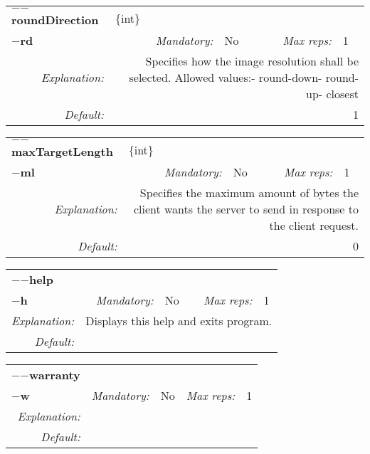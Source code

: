 \begin{center}\begin{tabular}{|rr|rl|rl|}
\hline
\multicolumn{2}{|l|}{\textbf{$-$$-$roundDirection}} & \multicolumn{4}{|l|}{$\{$int$\}$} \\
\cline{3-6}
\multicolumn{2}{|l|}{\textbf{$-$rd}} & \emph{Mandatory:} & No & \emph{Max reps:} & 1 \\
\hline
\emph{Explanation:} & \multicolumn{5}{|p{12cm}|}{Specifies how the image resolution shall be selected. Allowed values:\newline  1- round-down\newline  2- round-up\newline  3- closest} \\
\hline
\emph{Default:} & \multicolumn{5}{|p{12cm}|}{1} \\
\hline
\end{tabular}\end{center}
\begin{center}\begin{tabular}{|rr|rl|rl|}
\hline
\multicolumn{2}{|l|}{\textbf{$-$$-$maxTargetLength}} & \multicolumn{4}{|l|}{$\{$int$\}$} \\
\cline{3-6}
\multicolumn{2}{|l|}{\textbf{$-$ml}} & \emph{Mandatory:} & No & \emph{Max reps:} & 1 \\
\hline
\emph{Explanation:} & \multicolumn{5}{|p{12cm}|}{Specifies the maximum amount of bytes the client wants the server to send in response to the client request.} \\
\hline
\emph{Default:} & \multicolumn{5}{|p{12cm}|}{0} \\
\hline
\end{tabular}\end{center}
\begin{center}\begin{tabular}{|rr|rl|rl|}
\hline
\multicolumn{2}{|l|}{\textbf{$-$$-$help}} & \multicolumn{4}{|l|}{} \\
\cline{3-6}
\multicolumn{2}{|l|}{\textbf{$-$h}} & \emph{Mandatory:} & No & \emph{Max reps:} & 1 \\
\hline
\emph{Explanation:} & \multicolumn{5}{|p{12cm}|}{Displays this help and exits program.} \\
\hline
\emph{Default:} & \multicolumn{5}{|p{12cm}|}{} \\
\hline
\end{tabular}\end{center}
\begin{center}\begin{tabular}{|rr|rl|rl|}
\hline
\multicolumn{2}{|l|}{\textbf{$-$$-$warranty}} & \multicolumn{4}{|l|}{} \\
\cline{3-6}
\multicolumn{2}{|l|}{\textbf{$-$w}} & \emph{Mandatory:} & No & \emph{Max reps:} & 1 \\
\hline
\emph{Explanation:} & \multicolumn{5}{|p{12cm}|}{} \\
\hline
\emph{Default:} & \multicolumn{5}{|p{12cm}|}{} \\
\hline
\end{tabular}\end{center}
